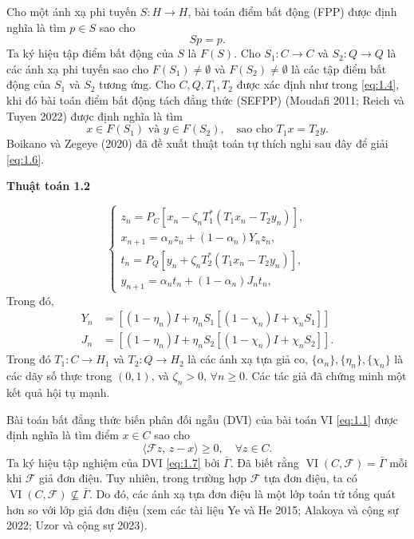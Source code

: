 \documentclass[11pt,a4paper]{article}
\theoremstyle{plain}
\theoremstyle{definition}
\theoremstyle{remark}
\numberwithin{equation}{section}
\newcommand{\Fc}{\mathcal{F}}
\newcommand{\inp}[2]{\langle #1,\,#2\rangle}
\DeclareMathOperator{\VI}{VI}
\newcommand{\Gam}{\bar{\Gamma}}
\newcommand{\Fix}[1]{F(#1)}
\newenvironment{algobox}[1]
  {\par\medskip\noindent\textbf{#1}\par\vspace{-2pt}\noindent\hrulefill\par\nopagebreak\vspace{2pt}}
  {\par\noindent\hrulefill\par\medskip}
\begin{document}
Cho một ánh xạ phi tuyến $S:H\to H$, bài toán điểm bất động (FPP) được định nghĩa là tìm $p\in S$ sao cho
\[
Sp=p.
\]
Ta ký hiệu tập điểm bất động của $S$ là $\Fix{S}$. Cho $S_1:C\to C$ và $S_2:Q\to Q$ là các ánh xạ phi tuyến sao cho $\Fix{S_1}\ne\emptyset$ và $\Fix{S_2}\ne\emptyset$ là các tập điểm bất động của $S_1$ và $S_2$ tương ứng. Cho $C,Q,T_1,T_2$ được xác định như trong \eqref{eq:1.4}, khi đó bài toán điểm bất động tách đẳng thức (SEFPP) (Moudafi 2011; Reich và Tuyen 2022) được định nghĩa là tìm
\begin{equation}
x\in \Fix{S_1} \text{ và } y\in \Fix{S_2},\quad \text{sao cho } T_1x=T_2y. \label{eq:1.6}
\end{equation}
Boikano và Zegeye (2020) đã đề xuất thuật toán tự thích nghi sau đây để giải \eqref{eq:1.6}.

\begin{algobox}{Thuật toán 1.2}
\[
\begin{cases}
z_n=P_C[x_n-\zeta_n T_1^{*}(T_1x_n-T_2y_n)],\\
x_{n+1}=\alpha_n z_n+(1-\alpha_n)Y_n z_n,\\
t_n=P_Q[y_n+\zeta_n T_2^{*}(T_1x_n-T_2y_n)],\\
y_{n+1}=\alpha_n t_n+(1-\alpha_n)J_n t_n,
\end{cases}
\]
Trong đó,
\begin{align*}
Y_n &= [(1-\eta_n)I+\eta_n S_1[(1-\chi_n)I+\chi_n S_1]]\\
J_n &= [(1-\eta_n)I+\eta_n S_2[(1-\chi_n)I+\chi_n S_2]].
\end{align*}
Trong đó $T_1:C\to H_1$ và $T_2:Q\to H_2$ là các ánh xạ tựa giả co, $\{\alpha_n\},\{\eta_n\},\{\chi_n\}$ là các dãy số thực trong $(0,1)$, và $\zeta_n>0$, $\forall n\ge 0$. Các tác giả đã chứng minh một kết quả hội tụ mạnh.
\end{algobox}

Bài toán bất đẳng thức biến phân đối ngẫu (DVI) của bài toán VI \eqref{eq:1.1} được định nghĩa là tìm điểm $x\in C$ sao cho
\begin{equation}
\inp{\Fc z}{z-x}\ge 0,\quad\forall z\in C. \label{eq:1.7}
\end{equation}
Ta ký hiệu tập nghiệm của DVI \eqref{eq:1.7} bởi $\Gam$. Đã biết rằng $\VI(C,\Fc)=\Gam$ mỗi khi $\Fc$ giả đơn điệu. Tuy nhiên, trong trường hợp $\Fc$ tựa đơn điệu, ta có $\VI(C,\Fc)\not\subseteq\Gam$. Do đó, các ánh xạ tựa đơn điệu là một lớp toán tử tổng quát hơn so với lớp giả đơn điệu (xem các tài liệu Ye và He 2015; Alakoya và cộng sự 2022; Uzor và cộng sự 2023).
\end{document}
